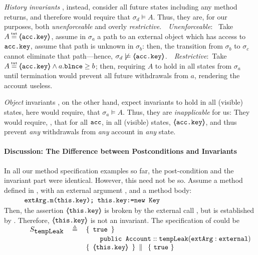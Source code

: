 {\emph{History  invariants}} \cite{liskov94behavioral,usinghistory,Cohen10}, instead, consider {all  future states including any method returns}, and therefore {would  require that   $\sigma_d \models A$. Thus, they are,}  for our purposes,  both
 \emph{unenforceable} and overly \emph{restrictive}.\ \  \emph{Unenforceable}: \ Take $A \txteq \inside{\prg{acc.key}}$,  assume  in $\sigma_a$ a path to an external object which has access to $\mbox{\normalfont{\texttt{acc.key}}}$, assume that path is unknown in $\sigma_b$: then, the transition from $\sigma_b$ to $\sigma_c$ cannot eliminate that path—hence, $\sigma_d \not\models \langle\!\!\langle \mbox{\normalfont{\texttt{acc.key}}} \rangle\!\!\rangle$.\ \  \emph{Restrictive}:\ Take $A \txteq \inside{\prg{acc.key}}\wedge a.\prg{blnce}\geq b$; then,  requiring  $A$   to hold in all states from $\sigma_a$ until termination would prevent all future withdrawals from $a$, rendering the account useless.

{\emph{Object}} invariants  \cite{Meyer92,MeyerDBC92,BarDelFahLeiSch04,objInvars,MuellerPoetzsch-HeffterLeavens06}, on the other hand, expect %
invariants to hold in all (visible) states,
here would require,  \eg that $\sigma_a \models A$. Thus, they  are %
\emph{inapplicable} for us: They would require, \eg, that for all %
 $\mbox{\normalfont{\texttt{acc}}}$, in all (visible) states, $\langle\!\!\langle \mbox{\normalfont{\texttt{acc.key}}} \rangle\!\!\rangle$, and thus prevent \emph{any} withdrawals from \emph{any} account in \emph{any} state.
 


 

\paragraph{Discussion: The Difference between Postconditions and Invariants}
In all our method specification examples so far, the post-condition and the invariant part were identical.
However, this need not be so. 
Assume a method  defined in , with an external argument , and a method body:
\\
$\strut \hspace{1cm} \mbox{\normalfont{\texttt{extArg.m(this.key); this.key:=new Key}}}$
\\
Then, the assertion   $ \langle\!\!\langle \mbox{\normalfont{\texttt{this.key}}} \rangle\!\!\rangle$  is  broken by the external call , but is  established by .
Therefore, $ \langle\!\!\langle \mbox{\normalfont{\texttt{this.key}}} \rangle\!\!\rangle$  is not an invariant.
The specification of  could be\\
$
{\sprepost
		{\strut \ \ \ \ \ \ \ \ \ S_{\prg{tempLeak}}} 
		{  \ \prg{true}\  }
		{\prg{public Account}} {\prg{tempLeak}} {\prg{extArg}:\prg{external}}
		{  \  \inside{\prg{this.key} }\  }
		{  \  \prg{true}\  }
}
$

